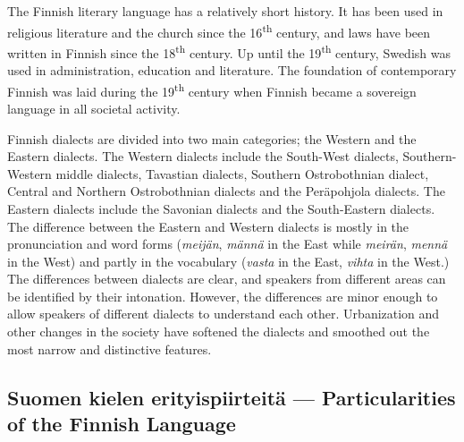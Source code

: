 \documentclass[]{../../metanetpaper}
\begin{document}
\begin{Parallel}[c]{70mm}{70mm}
{The Finnish literary language has a relatively short history. It has been used
in religious literature and the church since the 16\textsuperscript{th} century, and laws have
been written in Finnish since the 18\textsuperscript{th} century. Up until the 19\textsuperscript{th} century,
Swedish was used in administration, education and literature. The foundation of
contemporary Finnish was laid during the 19\textsuperscript{th} century when Finnish became a
sovereign language in all societal activity.

Finnish dialects are divided into two main categories; the Western and the
Eastern dialects. The Western dialects include the South-West dialects,
Southern-Western middle dialects, Tavastian dialects, Southern Ostrobothnian
dialect, Central and Northern Ostrobothnian dialects and the Peräpohjola
dialects. The Eastern dialects include the Savonian dialects and the
South-Eastern dialects. The difference between the Eastern and Western dialects
is mostly in the pronunciation and word forms
 (\textit{\foreignlanguage{finnish}{\textit{meijän}}},
  \textit{\foreignlanguage{finnish}{\textit{männä}}} in the East while
  \textit{\foreignlanguage{finnish}{\textit{meirän}}},
  \textit{\foreignlanguage{finnish}{\textit{mennä}}} in the West)
and partly in the vocabulary
 (\textit{\foreignlanguage{finnish}{\textit{vasta}}} in the East,
  \textit{\foreignlanguage{finnish}{\textit{vihta}}} in the West.)
The differences between dialects are clear, and speakers
from different areas can be identified by their intonation. However, the
differences are minor enough to allow speakers of different dialects to
understand each other. Urbanization and other changes in the society have
softened the dialects and smoothed out the most narrow and distinctive
features.
}

\ParallelPar

\subsection{Suomen kielen erityispiirteitä --- Particularities of the Finnish Language}

\end{Parallel}
\end{document}
